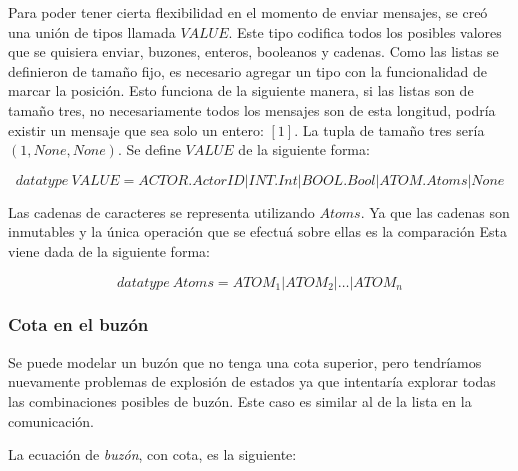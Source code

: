 Para poder tener cierta flexibilidad en el momento de enviar mensajes, se creó una unión de tipos llamada $VALUE$. Este tipo codifica todos los posibles valores que se quisiera enviar, buzones, enteros, booleanos y cadenas. Como las listas se definieron de tamaño fijo, es necesario agregar un tipo con la funcionalidad de marcar la posición. Esto funciona de la siguiente manera, si las listas son de tamaño tres, no necesariamente todos los mensajes son de esta longitud, podría existir un mensaje que sea solo un entero: $[1]$. La tupla de tamaño tres sería $(1, None, None)$. Se define $VALUE$ de la siguiente forma:

\[
  datatype\ VALUE = ACTOR.ActorID | INT.Int | BOOL.Bool | ATOM.Atoms | None
\]

Las cadenas de caracteres se representa utilizando $Atoms$. Ya que las cadenas son inmutables y la única operación que se efectuá sobre ellas es la comparación Esta viene dada de la siguiente forma:

\[
  datatype\ Atoms = ATOM_1 | ATOM_2 | \ldots | ATOM_n
\]

\subsubsection*{Cota en el buzón}

Se puede modelar un buzón que no tenga una cota superior, pero tendríamos nuevamente problemas de explosión de estados ya que \FDR intentaría explorar todas las combinaciones posibles de buzón. Este caso es similar al de la lista en la comunicación. 

La ecuación de \textit{buzón}, con cota, es la siguiente:

